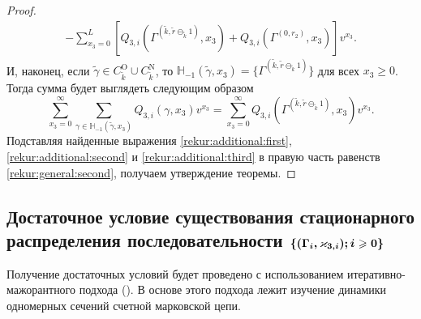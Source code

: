 \documentclass{report}
\newcommand{\MarkThree}{\{(\Gamma_i, \varkappa_{3,i}); \hm{} i \geqslant 0\}}
\begin{document}
\begin{proof}
\begin{multline}
-\sum_{x_3=0}^{L} \left[ Q_{3,i}(\Gamma^{(\tilde{k},\tilde{r}\ominus_{\tilde{k}} 1)},x_3) + Q_{3,i}(\Gamma^{(0,r_2)},x_3) \right] v^{x_3}.
\label{rekur:additional:second}
\end{multline}
И, наконец, если $\tilde{\gamma}\in C_{\tilde{k}}^{\mathrm{O}} \cup C_{\tilde{k}}^{\mathrm{N}}$, то ${\mathbb H}_{-1}(\tilde{\gamma},x_3) = \{\Gamma^{(\tilde{k},\tilde{r}\ominus_{\tilde{k}} 1)}\}$ для всех $x_3\geqslant 0$. Тогда сумма будет выглядеть следующим образом
\begin{equation}
\sum_{x_3=0}^{\infty} \sum_{\gamma \in {\mathbb H}_{-1}(\tilde{\gamma},x_3)} Q_{3,i}(\gamma,x_3) v^{x_3} = \sum_{x_3=0}^{\infty} Q_{3,i}(\Gamma^{(\tilde{k},\tilde{r}\ominus_{\tilde{k}} 1)},x_3) v^{x_3}.
\label{rekur:additional:third}
\end{equation}
Подставляя найденные выражения \eqref{rekur:additional:first}, \eqref{rekur:additional:second} и \eqref{rekur:additional:third} в правую часть равенств \eqref{rekur:general:second}, получаем утверждение теоремы.
\end{proof}

\subsection[Достаточное условие существования стационарного {распределения} последовательности $\MarkThree$]%
{ Достаточное условие существования стационарного {распределения} последовательности $\boldsymbol{\MarkThree}$}
Получение достаточных условий будет проведено с использованием итеративно-мажорантного подхода (\cite{Fedotkin:1988,Fedotkin:1989}). В основе этого подхода лежит изучение динамики одномерных сечений счетной марковской цепи. 
\end{document}

